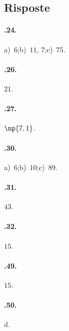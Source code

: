 \subsection{Risposte}
\begin{multicols}{2}
 \paragraph{\thechapter.24.}
a)~$6$;\quad b)~$11$, $7$;\quad c)~$75$.

\paragraph{\thechapter.26.} $21$.

\paragraph{\thechapter.27.} $\np{7,1}$.

\paragraph{\thechapter.30.}
a)~$6$;\quad b)~$10$;\quad c)~$89$.

\paragraph{\thechapter.31.} $43$.

\paragraph{\thechapter.32.} $15$.

\paragraph{\thechapter.49.} $15$.

\paragraph{\thechapter.50.} d.
\end{multicols}

